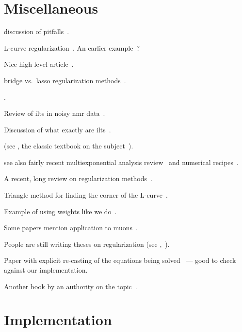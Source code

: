 \section{Miscellaneous \label{sec:miscellaneous}}

discussion of pitfalls~\cite{1983-Varah-SIAMJSSC-4-164}.

L-curve regularization~\cite{1992-Hansen-SIAMR-34-561, 1993-Hansen-SIAMJSC-14-1487}.
An earlier example~\cite{1990-Hansen-SIAMJSSC-11-503}?

Nice high-level article~\cite{1994-Craig-CP-8-648}.

bridge vs.\ lasso regularization methods~\cite{1998-Wenjiang-JCGS-7-397}.

\cite{2002-Venkataramanan-IEEETSP-50-1017}.

Review of \glspl{ilt} in noisy \gls{nmr} data~\cite{2013-Berman-CMRPA-42-72}.

Discussion of what exactly are \glspl{ilt}~\cite{2017-Fordham-DF-29-2}.

(see , the classic textbook on the subject~\cite{1995-Lawson-SLSP}).

see also fairly recent multiexponential analysis review~\cite{1999-Istratov-RSI-70-1233} and numerical recipes~\cite{numerical-recipies}.

A recent, long review on regularization methods~\cite{2018-Benning-AN-27-1}.

Triangle method for finding the corner of the L-curve~\cite{2002-Castellanos-ANM-43-359}.

Example of using weights like we do~\cite{1999-Dunn-JMR-140-153}.

Some papers mention application to muons~\cite{1984-Honig-JCAM-10-113}.

People are still writing theses on regularization (see ,~\cite{2011-OrozcoRodriguez-PhD}).

Paper with explicit re-casting of the equations being solved~\cite{2001-OLeary-SIAMJSC-23-1161} --- good to check against our implementation.

Another book by an authority on the topic~\cite{1998-Hansen-RDDIPP}.

\section{Implementation \label{sec:implementation}}

